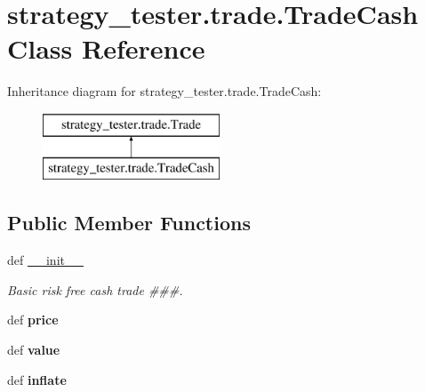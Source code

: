 \hypertarget{classstrategy__tester_1_1trade_1_1TradeCash}{\section{strategy\-\_\-tester.\-trade.\-Trade\-Cash \-Class \-Reference}
\label{classstrategy__tester_1_1trade_1_1TradeCash}
}
\-Inheritance diagram for strategy\-\_\-tester.\-trade.\-Trade\-Cash\-:\begin{figure}[H]
\begin{center}
\leavevmode
\includegraphics[height=2.000000cm]{classstrategy__tester_1_1trade_1_1TradeCash}
\end{center}
\end{figure}
\subsection*{\-Public \-Member \-Functions}
\begin{DoxyCompactItemize}
\item 
\hypertarget{classstrategy__tester_1_1trade_1_1TradeCash_ae51c831b70476cbe389c65e4aa072d16}{def \hyperlink{classstrategy__tester_1_1trade_1_1TradeCash_ae51c831b70476cbe389c65e4aa072d16}{\-\_\-\-\_\-init\-\_\-\-\_\-}}\label{classstrategy__tester_1_1trade_1_1TradeCash_ae51c831b70476cbe389c65e4aa072d16}

\begin{DoxyCompactList}\small\item\em \-Basic risk free cash trade \#\#\#. \end{DoxyCompactList}\item 
\hypertarget{classstrategy__tester_1_1trade_1_1TradeCash_a2c3cb51e61645f5147d2551d9759d929}{def {\bfseries price}}\label{classstrategy__tester_1_1trade_1_1TradeCash_a2c3cb51e61645f5147d2551d9759d929}

\item 
\hypertarget{classstrategy__tester_1_1trade_1_1TradeCash_ae00473dec0c67a3f3e8bff4b28272f48}{def {\bfseries value}}\label{classstrategy__tester_1_1trade_1_1TradeCash_ae00473dec0c67a3f3e8bff4b28272f48}

\item 
\hypertarget{classstrategy__tester_1_1trade_1_1TradeCash_af25f94d67327c5e32efe6f7d938d289b}{def {\bfseries inflate}}\label{classstrategy__tester_1_1trade_1_1TradeCash_af25f94d67327c5e32efe6f7d938d289b}

\end{DoxyCompactItemize}
